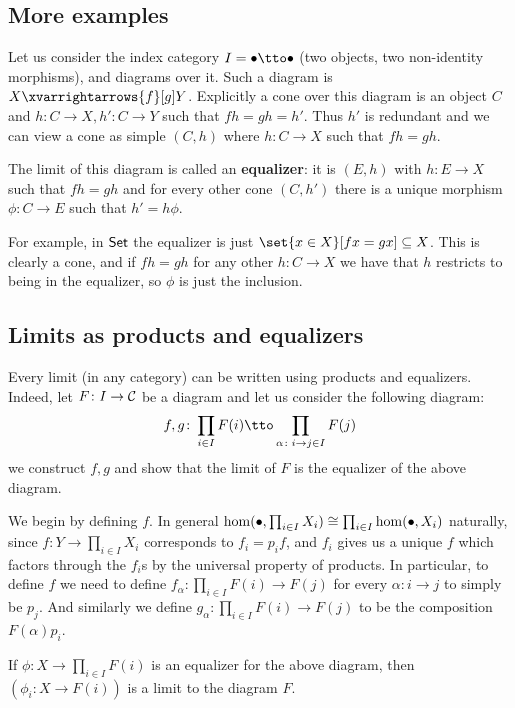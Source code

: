 \subsection{More examples}

Let us consider the index category $I=\bul\tto\bul$ (two objects, two non-identity morphisms), and diagrams over it.
Such a diagram is $X\xvarrightarrows{f}[g]Y$.
Explicitly a cone over this diagram is an object $C$ and $h\colon C\to X,h'\colon C\to Y$ such that $fh=gh=h'$.
Thus $h'$ is redundant and we can view a cone as simple $(C,h)$ where $h\colon C\to X$ such that $fh=gh$.

The limit of this diagram is called an {\bf equalizer}: it is $(E,h)$ with $h\colon E\to X$ such that $fh=gh$ and for every other cone $(C,h')$
there is a unique morphism $\phi\colon C\to E$ such that $h'=h\phi$.

For example, in ${\sf Set}$ the equalizer is just $\set{x\in X}[fx=gx]\subseteq X$.
This is clearly a cone, and if $fh=gh$ for any other $h\colon C\to X$ we have that $h$ restricts to being in the equalizer, so $\phi$ is just the inclusion.

\subsection{Limits as products and equalizers}

Every limit (in any category) can be written using products and equalizers.
Indeed, let $F\colon I\to{{\cal C}}$ be a diagram and let us consider the following diagram:
$$ f,g\colon\prod_{i\in I}F(i)\tto\prod_{\alpha\colon i\to j\in I}F(j) $$
we construct $f,g$ and show that the limit of $F$ is the equalizer of the above diagram.

We begin by defining $f$.
In general $\hom(\bullet,\prod_{i\in I}X_i)\cong\prod_{i\in I}\hom(\bullet,X_i)$ naturally, since $f\colon Y\to\prod_{i\in I}X_i$ corresponds to $f_i=p_if$, and $f_i$ gives us a unique $f$ which
factors through the $f_i$s by the universal property of products.
In particular, to define $f$ we need to define $f_\alpha\colon\prod_{i\in I}F(i)\to F(j)$ for every $\alpha\colon i\to j$ to simply be $p_j$.
And similarly we define $g_\alpha\colon\prod_{i\in I}F(i)\to F(j)$ to be the composition $F(\alpha)p_i$.

\bthrm

    If $\phi\colon X\to\prod_{i\in I}F(i)$ is an equalizer for the above diagram, then $(\phi_i\colon X\to F(i))$ is a limit to the diagram $F$.

\ethrm

